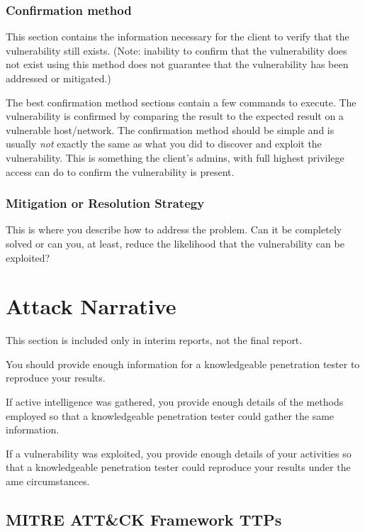 \documentclass[notitlepage]{article}
\begin{document}
  	\subsubsection*{Confirmation method}
  	
		This section contains the information necessary for the
		client to verify that the vulnerability still exists.
		(Note: inability to confirm that the vulnerability
		does not exist using this method does not
		guarantee that the vulnerability has been addressed
		or mitigated.)
		
		The best confirmation method sections contain a few commands
		to execute. The vulnerability is confirmed by comparing
		the result to the expected result on a vulnerable
		host/network. The confirmation method should be simple
		and is usually \emph{not} exactly the same as what you
		did to discover and exploit the vulnerability.
		This is something the client's admins, with full
		highest privilege access can do to confirm the
		vulnerability is present.
		
    \subsubsection*{Mitigation or Resolution Strategy}
    
    	This is where you describe how to address the problem.
    	Can it be completely solved or can you, at least, reduce the
    	likelihood that the vulnerability can be exploited?
		



\section{Attack Narrative}

	This section is included only in interim reports,
	not the final report.

	
	You should provide enough information for a knowledgeable
	penetration tester to reproduce your results.

	If active intelligence was gathered, you provide enough details
	of the methods employed so that a knowledgeable penetration
	tester could gather the same information.
	
	If a vulnerability was exploited, you provide enough details
	of your activities so that a knowledgeable penetration tester
	could reproduce your results under the ame circumstances.

    \subsection{MITRE ATT{\&}CK Framework TTPs}
    
\end{document}
